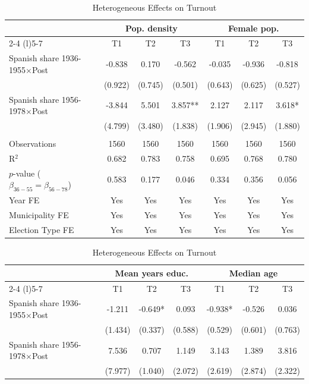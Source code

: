 \begin{table}[!h]
\centering
\renewcommand{\arraystretch}{1.15}
\setlength{\tabcolsep}{6pt}
\captionsetup{justification=centering}
\caption{Heterogeneous Effects on Turnout}
\begin{tabular*}{\textwidth}{l@{\extracolsep{\fill}}cccccc}
\hline
 & \multicolumn{3}{c}{Pop. density} & \multicolumn{3}{c}{Female pop.} \\
\cmidrule(l){2-4} \cmidrule(l){5-7}
  & T1 & T2 & T3 & T1  & T2  & T3 \\
\hline
Spanish share 1936-1955$\times$Post & -0.838 & 0.170 & -0.562 & -0.035 & -0.936 & -0.818\\
 & (0.922) & (0.745) & (0.501) & (0.643) & (0.625) & (0.527)\\
Spanish share 1956-1978$\times$Post & -3.844 & 5.501 & 3.857** & 2.127 & 2.117 & 3.618*\\
 & (4.799) & (3.480) & (1.838) & (1.906) & (2.945) & (1.880)\\

 & & & & & & \\
Observations & 1560 & 1560 & 1560 & 1560 & 1560 & 1560\\
R$^2$ & 0.682 & 0.783 & 0.758 & 0.695 & 0.768 & 0.780\\
$p$-value ($\beta_{36{-}55} = \beta_{56{-}78}$) & 0.583 & 0.177 & 0.046 & 0.334 & 0.356 & 0.056\\
Year FE & Yes & Yes & Yes & Yes & Yes & Yes\\
Municipality FE & Yes & Yes & Yes & Yes & Yes & Yes\\
Election Type FE & Yes & Yes & Yes & Yes & Yes & Yes\\
\hline
\end{tabular*}
\begin{tabular*}{\textwidth}{l@{\extracolsep{\fill}}cccccc}
 & \multicolumn{3}{c}{Mean years educ.} & \multicolumn{3}{c}{Median age} \\
\cmidrule(l){2-4} \cmidrule(l){5-7}
  & T1 & T2 & T3 & T1  & T2  & T3 \\
\hline
Spanish share 1936-1955$\times$Post & -1.211 & -0.649* & 0.093 & -0.938* & -0.526 & 0.036\\
 & (1.434) & (0.337) & (0.588) & (0.529) & (0.601) & (0.763)\\
Spanish share 1956-1978$\times$Post & 7.536 & 0.707 & 1.149 & 3.143 & 1.389 & 3.816\\
 & (7.977) & (1.040) & (2.072) & (2.619) & (2.874) & (2.322)\\


\end{tabular*}
\end{table}
